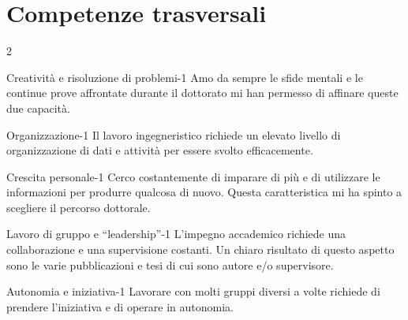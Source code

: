 \section{Competenze trasversali}

\vspace{-\baselineskip}

\begin{multicols}{2}

\skill
    {Creatività e risoluzione di problemi}{-1}
    {
        Amo da sempre le sfide mentali e le continue prove affrontate durante il dottorato mi han permesso di affinare queste due capacità.
    }

\skill
    {Organizzazione}{-1}
    {
        Il lavoro ingegneristico richiede un elevato livello di organizzazione di dati e attività per essere svolto efficacemente.
    }

\skill
    {Crescita personale}{-1}
    {
        Cerco costantemente di imparare di più e di utilizzare le informazioni per produrre qualcosa di nuovo.
        Questa caratteristica mi ha spinto a scegliere il percorso dottorale.
    }

\skill
    {Lavoro di gruppo e ``leadership''}{-1}
    {
        L'impegno accademico richiede una collaborazione e una supervisione costanti.
        Un chiaro risultato di questo aspetto sono le varie pubblicazioni e tesi di cui sono autore e/o supervisore.
    }

\skill
    {Autonomia e iniziativa}{-1}
    {
        Lavorare con molti gruppi diversi a volte richiede di prendere l'iniziativa e di operare in autonomia.
    }

\end{multicols}
